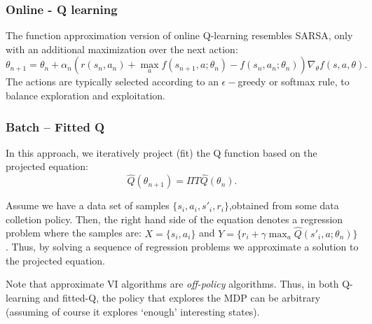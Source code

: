\subsubsection{Online - Q learning}
The function approximation version of online Q-learning resembles SARSA, only with an additional maximization over the next action:
\begin{equation*}
    \theta_{n+1} = \theta_n + \alpha_n \left( r(s_n,a_n) + \max_a f(s_{n+1},a;\theta_n) - f(s_{n},a_{n}; \theta_n) \right) \nabla_{\theta} f(s,a,\theta).
\end{equation*}
The actions are typically selected according to an $\epsilon-$greedy or softmax rule, to balance exploration and exploitation.

\subsubsection{Batch -- Fitted Q}

In this approach, we iteratively project (fit) the Q function based on the projected equation:
\begin{equation*}
    \hat{Q}(\theta_{n+1}) = \Pi T \hat{Q}(\theta_{n}).
\end{equation*}

Assume we have a data set of samples $\{s_i,a_i,s'_i,r_i\}$,obtained from some data colletion policy. Then, the right hand side of the equation denotes a regression problem where the samples are: $X = \{s_i,a_i\}$ and $Y = \{ r_i + \gamma \max_a \hat{Q}(s'_i, a;\theta_{n})\}$. Thus, by solving a sequence of regression problems we approximate a solution to the projected equation.

Note that approximate VI algorithms are \emph{off-policy} algorithms. Thus, in both Q-learning and fitted-Q, the policy that explores the MDP can be arbitrary (assuming of course it explores `enough' interesting states).
